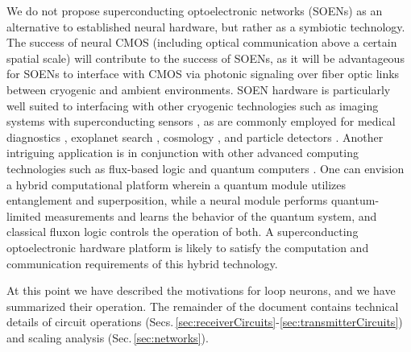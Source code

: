 \documentclass[aip,amsmath,amssymb,reprint,nofootinbib]{revtex4-1}
\begin{document}
We do not propose superconducting optoelectronic networks (SOENs) as an alternative to established neural hardware, but rather as a symbiotic technology. The success of neural CMOS (including optical communication above a certain spatial scale) will contribute to the success of SOENs, as it will be advantageous for SOENs to interface with CMOS via photonic signaling over fiber optic links between cryogenic and ambient environments. SOEN hardware is particularly well suited to interfacing with other cryogenic technologies such as imaging systems with superconducting sensors  \cite{alve2015,chsc2017}, as are commonly employed for medical diagnostics \cite{hada2016}, exoplanet search \cite{raca2016,boga1992,kila2016}, cosmology \cite{diad2017}, and particle detectors \cite{le2017}. Another intriguing application is in conjunction with other advanced computing technologies such as flux-based logic \cite{li2012,taoz2013,hehe2011} and quantum computers \cite{nich2000,blga2007,zwdz2013,hipe2015,we2017}. One can envision a hybrid computational platform \cite{deli2017,posc2017} wherein a quantum module utilizes entanglement and superposition, while a neural module performs quantum-limited measurements and learns the behavior of the quantum system, and classical fluxon logic controls the operation of both. A superconducting optoelectronic hardware platform is likely to satisfy the computation and communication requirements of this hybrid technology. 

At this point we have described the motivations for loop neurons, and we have summarized their operation. The remainder of the document contains technical details of circuit operations (Secs.\,\ref{sec:receiverCircuits}-\ref{sec:transmitterCircuits}) and scaling analysis (Sec.\,\ref{sec:networks}).

\end{document}
